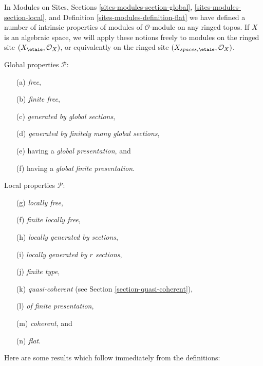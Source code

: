 \noindent
In
Modules on Sites, Sections
\ref{sites-modules-section-global},
\ref{sites-modules-section-local}, and
Definition \ref{sites-modules-definition-flat}
we have defined a number of intrinsic properties of modules of
$\mathcal{O}$-module on any ringed topos. If $X$ is an algebraic
space, we will apply these notions freely to modules on the ringed
site $(X_\etale, \mathcal{O}_X)$, or equivalently on the ringed site
$(X_{spaces, \etale}, \mathcal{O}_X)$.

\medskip\noindent
Global properties $\mathcal{P}$:
\begin{enumerate}
\item[(a)] {\it free},
\item[(b)] {\it finite free},
\item[(c)] {\it generated by global sections},
\item[(d)] {\it generated by finitely many global sections},
\item[(e)] having a {\it global presentation}, and
\item[(f)] having a {\it global finite presentation}.
\end{enumerate}
Local properties $\mathcal{P}$:
\begin{enumerate}
\item[(g)] {\it locally free},
\item[(f)] {\it finite locally free},
\item[(h)] {\it locally generated by sections},
\item[(i)] {\it locally generated by $r$ sections},
\item[(j)] {\it finite type},
\item[(k)] {\it quasi-coherent} (see Section \ref{section-quasi-coherent}),
\item[(l)] {\it of finite presentation},
\item[(m)] {\it coherent}, and
\item[(n)] {\it flat}.
\end{enumerate}
Here are some results which follow immediately from the definitions:
